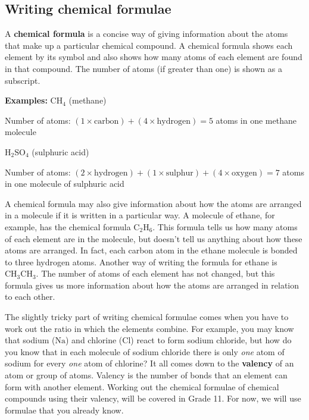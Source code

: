            \subsection{ Writing chemical formulae}
            \nopagebreak
      \label{m38721*id62835}A \textbf{chemical formula} is a concise way of giving information about the atoms that make up a particular chemical compound. A chemical formula shows each element by its symbol and also shows how many atoms of each element are found in that compound. The number of atoms (if greater than one) is shown as a subscript.\par 
      \label{m38721*id62111}\noindent{}\textbf{Examples:}
        \textbf{${\mathrm{CH}}_{4}$} (methane)\par 
      \label{m38721*id63054}Number of atoms: $\left(1\ensuremath{\times}\mathrm{carbon}\right)+\left(4\ensuremath{\times}\mathrm{hydrogen}\right)=5$ atoms in one methane molecule\par 
      \label{m38721*id63058}\textbf{${\mathrm{H}}_{2}{\mathrm{SO}}_{4}$} (sulphuric acid)\par 
      \label{m38721*id63091}Number of atoms: $\left(2\ensuremath{\times}\mathrm{hydrogen}\right)+\left(1\ensuremath{\times}\mathrm{sulphur}\right)+\left(4\ensuremath{\times}\mathrm{oxygen}\right)=7$ atoms in one molecule of sulphuric acid\par 
      \label{m38721*id63095}A chemical formula may also give information about how the atoms are arranged in a molecule if it is written in a particular way. A molecule of ethane, for example, has the chemical formula ${\mathrm{C}}_{2}{\mathrm{H}}_{6}$. This formula tells us how many atoms of each element are in the molecule, but doesn't tell us anything about how these atoms are arranged. In fact, each carbon atom in the ethane molecule is bonded to three hydrogen atoms. Another way of writing the formula for ethane is ${\mathrm{CH}}_{3}{\mathrm{CH}}_{3}$. The number of atoms of each element has not changed, but this formula gives us more information about how the atoms are arranged in relation to each other.\par 
      \label{m38721*id63154}The slightly tricky part of writing chemical formulae comes when you have to work out the ratio in which the elements combine. For example, you may know that sodium ($\mathrm{Na}$) and chlorine ($\mathrm{Cl}$) react to form sodium chloride, but how do you know that in each molecule of sodium chloride there is only \textsl{one} atom of sodium for every \textsl{one} atom of chlorine? It all comes down to the \textbf{valency} of an atom or group of atoms. Valency is the number of bonds that an element can form with another element. Working out the chemical formulae of chemical compounds using their valency, will be covered in Grade 11. For now, we will use formulae that you already know.\par 
  \label{m38721**end}
